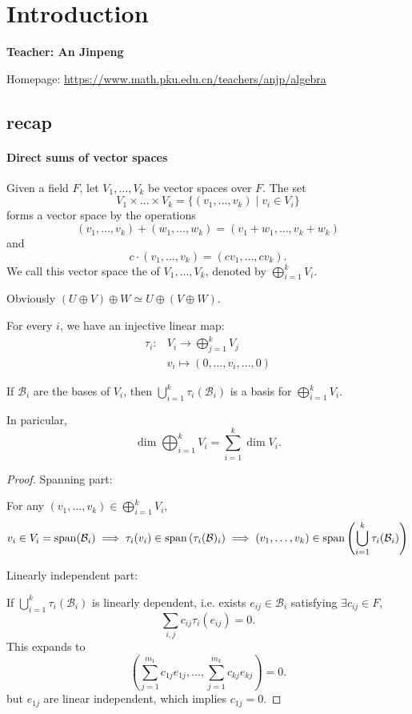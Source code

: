 \section{Introduction}
\label{sec:Introduction}
\begin{center}
	\sffamily\large\bfseries
	Teacher: An Jinpeng

	Homepage: \url{https://www.math.pku.edu.cn/teachers/anjp/algebra}
\end{center}

\subsection{recap}
\label{sub:recap}
\paragraph{Direct sums of vector spaces}
Given a field $F$, let $V_1,\dots,V_k$ be vector spaces over $F$.
The set
 \[
	V_1 \times \dots \times V_k = \{(v_1,\dots,v_k)\mid v_i\in V_i\}
\]
forms a vector space by the operations
\[
	(v_1,\dots,v_k) + (w_1,\dots,w_k) = (v_1+w_1,\dots,v_k+w_k)
\]
and
\[
c\cdot (v_1,\dots,v_k) = (cv_1,\dots,cv_k).
\]
We call this vector space the  of $V_1,\dots,V_k$,
denoted by $\bigoplus_{i=1}^k V_i$.

Obviously  $(U\oplus V)\oplus W\simeq U\oplus (V\oplus W)$.

For every $i$, we have an injective linear map:
 \begin{align*}
	\tau_i: &V_i \to \bigoplus_{j=1}^k V_j\\
	&v_i \mapsto (0,\dots,v_i,\dots,0)
\end{align*}
\begin{lemma}
	If $\mathcal{B}_i$ are the bases of $V_i$, then
	$\bigcup_{i=1}^k \tau_i(\mathcal{B}_i)$ is
	a basis for  $\bigoplus_{i=1}^k V_i$.

	In paricular,
	\[
		\dim \bigoplus_{i=1}^k V_i = \sum_{i=1}^k \dim V_i.
	\]
\end{lemma}
\begin{proof}[Proof]
    Spanning part:

	For any $(v_1,\dots,v_k)\in \bigoplus_{i=1}^kV_i$,
	\[
		v_i\in V_i = \operatorname{span}(\mathcal{B}_i)\implies
		\tau_i(v_i)\in \operatorname{span}\left(\tau_i(\mathcal{B})_i\right)\implies
		(v_1,\dots,v_k)\in \operatorname{span}\left(\bigcup_{i=1}^k \tau_i(\mathcal{B}_i)\right)
	\]

	Linearly independent part:

	If $\bigcup_{i=1}^k \tau_i(\mathcal{B}_i)$ is linearly dependent,
	i.e. exists $e_{ij}\in \mathcal{B}_i$ satisfying $\exists c_{ij}\in F$,
	\[
		\sum_{i,j} c_{ij} \tau_i(e_{ij}) = 0.
	\]
	This expands to
	\[
		\left( \sum_{j=1}^{m_1} c_{1j}e_{1j}, \dots, \sum_{j=1}^{m_k} c_{kj}e_{kj} \right)=0.
	\]
	but $e_{1j}$ are linear independent, which implies $c_{1j}=0$.
\end{proof}

